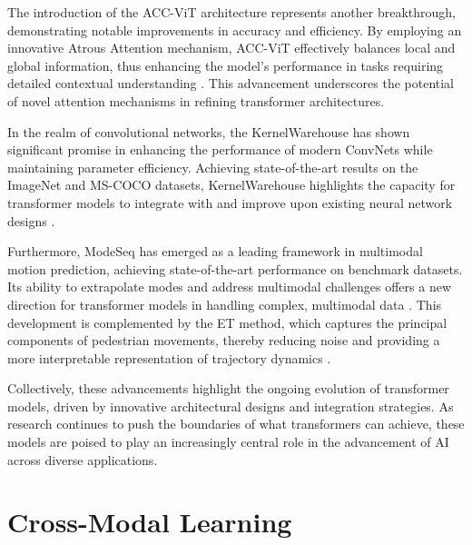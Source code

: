 The introduction of the ACC-ViT architecture represents another breakthrough, demonstrating notable improvements in accuracy and efficiency. By employing an innovative Atrous Attention mechanism, ACC-ViT effectively balances local and global information, thus enhancing the model's performance in tasks requiring detailed contextual understanding \cite{ibtehaz2024fusionregionalsparseattention}. This advancement underscores the potential of novel attention mechanisms in refining transformer architectures.



In the realm of convolutional networks, the KernelWarehouse has shown significant promise in enhancing the performance of modern ConvNets while maintaining parameter efficiency. Achieving state-of-the-art results on the ImageNet and MS-COCO datasets, KernelWarehouse highlights the capacity for transformer models to integrate with and improve upon existing neural network designs \cite{li2023kernelwarehouseparameterefficientdynamicconvolution}.



Furthermore, ModeSeq has emerged as a leading framework in multimodal motion prediction, achieving state-of-the-art performance on benchmark datasets. Its ability to extrapolate modes and address multimodal challenges offers a new direction for transformer models in handling complex, multimodal data \cite{zhou2024modeseqtamingsparsemultimodal}. This development is complemented by the ET method, which captures the principal components of pedestrian movements, thereby reducing noise and providing a more interpretable representation of trajectory dynamics \cite{bae2023eigentrajectorylowrankdescriptorsmultimodal}.



Collectively, these advancements highlight the ongoing evolution of transformer models, driven by innovative architectural designs and integration strategies. As research continues to push the boundaries of what transformers can achieve, these models are poised to play an increasingly central role in the advancement of AI across diverse applications.








\section{Cross-Modal Learning} \label{sec:Cross-Modal Learning}

